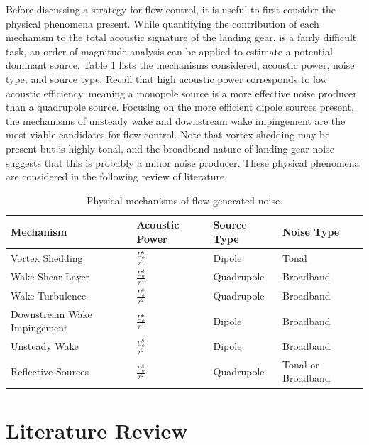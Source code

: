 Before discussing a strategy for flow control, it is useful to first consider the physical phenomena present. While quantifying the contribution of each mechanism to the total acoustic signature of the landing gear, is a fairly difficult task, an order-of-magnitude analysis can be applied to estimate a potential dominant source. Table \ref{tab:source} lists the mechanisms considered,  acoustic power, noise type, and source type. Recall that high acoustic power corresponds to low acoustic efficiency, meaning a monopole source is a more effective noise producer than a quadrupole source. Focusing on the more efficient dipole sources present, the mechanisms of unsteady wake and downstream wake impingement are the most viable candidates for flow control. Note that vortex shedding may be present but is highly tonal, and the broadband nature of landing gear noise suggests that this is probably a minor noise producer. These physical phenomena are considered in the following review of literature.

\begin{table}
 \setlength{\capwidth}{0.7\textwidth}
\begin{center}
\caption{Physical mechanisms of flow-generated noise.}
\label{tab:source}
\begin{tabular}{llll}\toprule
\parbox{0.15\linewidth}{Mechanism} & 
\parbox{0.15\linewidth}{Acoustic Power} & 
\parbox{0.15\linewidth}{Source Type} & 
\parbox{0.15\linewidth}{Noise Type} \\ \midrule
Vortex Shedding & $\frac{U_o^6}{r^2}$ & Dipole & Tonal  \\
Wake Shear Layer & $\frac{U_o^8}{r^2}$ & Quadrupole & Broadband \\
Wake Turbulence & $\frac{U_o^8}{r^2}$ & Quadrupole & Broadband \\
Downstream Wake Impingement & $\frac{U_o^6}{r^2}$ & Dipole & Broadband \\
Unsteady Wake & $\frac{U_o^6}{r^2}$ & Dipole & Broadband \\
Reflective Sources & $\frac{U_o^8}{r^2}$ & Quadrupole & Tonal or Broadband \\ \bottomrule
\end{tabular}
\end{center}
\end{table}

\section{Literature Review}

